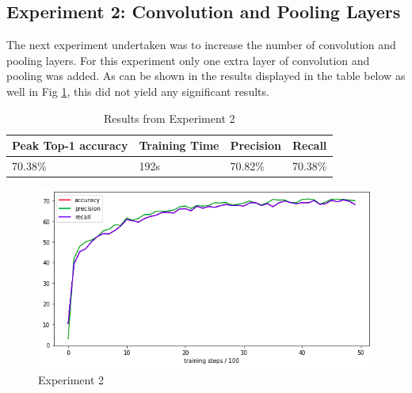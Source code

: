 \documentclass[12pt]{report}
\begin{document}
\begin{flushleft}
\vspace{0.5cm}
\section{Experiment 2: Convolution and Pooling Layers}
The next experiment undertaken was to increase the number of convolution and pooling layers. For this experiment only one extra layer of convolution and pooling was added. As can be shown in the results displayed in the table below as well in Fig \ref{fig:experiment-2}, this did not yield any significant results.

\vspace{0.5cm}
\begin{table}[ht!]
\begin{tabular}{llll}
\\ \hline
\multicolumn{1}{|l|}{Peak Top-1 accuracy} & \multicolumn{1}{l|}{Training Time} & \multicolumn{1}{l|}{Precision} & \multicolumn{1}{l|}{Recall}  \\ \hline
\multicolumn{1}{|l|}{70.38\%}             & \multicolumn{1}{l|}{192s}          & \multicolumn{1}{l|}{70.82\%}   & \multicolumn{1}{l|}{70.38\%} \\ \hline
\end{tabular}
\caption{Results from Experiment 2}
\end{table}

\vspace{0.5cm}
\begin{figure}[ht!]
	\centering
	\includegraphics[width=12cm]{experiment-2}
	\caption{Experiment 2}
	\label{fig:experiment-2}
\end{figure}
\end{flushleft}
\end{document}
